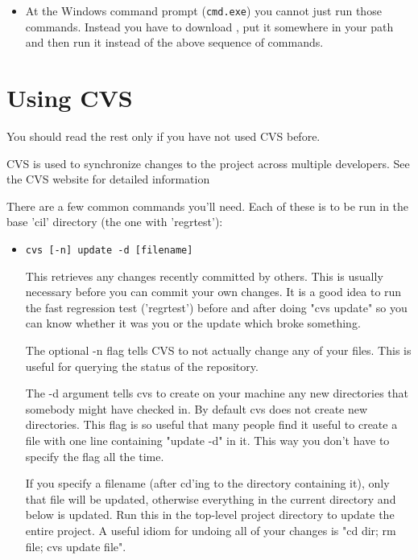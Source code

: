 \documentclass{article}
\def\t#1{{\tt #1}}
\begin{document}
{\begin{itemize}
       The first step starts the agent and the second on loads your identity
       in the agent. In this latter step you will be asked to enter your
       passphrase. 
     \item At the Windows command prompt (\t{cmd.exe}) you cannot just run
       those commands. Instead you have to download
       ,  
       put it somewhere in your path and then run it instead of the above
       sequence of commands. 
   \end{itemize}

\section{Using CVS}

 You should read the rest only if you have not used CVS before. 

 CVS is used to synchronize changes to the project across multiple
developers.  See the CVS website for detailed information

  
There are a few common commands you'll need.  Each of these is to be run
in the base 'cil' directory (the one with 'regrtest'):

\begin{itemize}
\item \t{cvs [-n] update -d [filename]}

    This retrieves any changes recently committed by others.  This is
    usually necessary before you can commit your own changes.  It is a
    good idea to run the fast regression test ('regrtest') before and
    after doing "cvs update" so you can know whether it was you or the
    update which broke something.

    The optional -n flag tells CVS to not actually change any of your
    files.  This is useful for querying the status of the repository.

    The -d argument tells cvs to create on your machine any new directories
    that somebody might have checked in. By default cvs does not create new
    directories. This flag is so useful that many people find it useful to
    create a  file with one line containing "update -d" in it.
    This way you don't have to specify the flag all the time.

    If you specify a filename (after cd'ing to the directory containing it),
    only that file will be updated, otherwise everything in the current
    directory and below is updated. Run this in the top-level project
    directory to update the entire project. A useful idiom for undoing all of
    your changes is "cd dir; rm file; cvs update file".


\end{itemize}}
\end{document}
